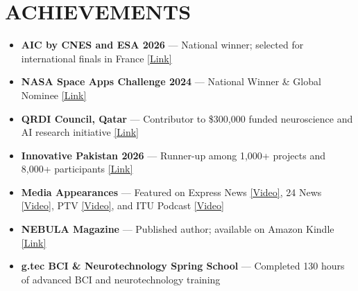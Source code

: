 \documentclass[letterpaper,9pt]{article}
\newcommand{\resumeItem}[1]{
  \item \small{#1}
}
\begin{document}
\section{ACHIEVEMENTS}
\begin{itemize}
\resumeItem{\textbf{AIC by CNES and ESA 2026} — National winner; selected for international finals in France \href{https://www.linkedin.com/posts/information-technology-university_\%F0\%9D\%97\%9C\%F0\%9D\%97\%A7\%F0\%9D\%97\%A8-\%F0\%9D\%97\%A7\%F0\%9D\%97\%B2\%F0\%9D\%97\%AE\%F0\%9D\%97\%BA-\%F0\%9D\%98\%81\%F0\%9D\%97\%BC-\%F0\%9D\%97\%A5\%F0\%9D\%97\%B2\%F0\%9D\%97\%BD\%F0\%9D\%97\%BF\%F0\%9D\%97\%B2\%F0\%9D\%98\%80\%F0\%9D\%97\%B2\%F0\%9D\%97\%BB\%F0\%9D\%98\%81-\%F0\%9D\%97\%A3\%F0\%9D\%97\%AE\%F0\%9D\%97\%B8\%F0\%9D\%97\%B6\%F0\%9D\%98\%80\%F0\%9D\%98\%81\%F0\%9D\%97\%AE\%F0\%9D\%97\%BB-activity-7440108338027065344-qhc0}{[Link]}}
\resumeItem{\textbf{NASA Space Apps Challenge 2024} — National Winner \& Global Nominee \href{https://www.spaceappschallenge.org/nasa-space-apps-2024/find-a-team/nebula-galaxar/?tab=details}{[Link]}}
\resumeItem{\textbf{QRDI Council, Qatar} — Contributor to \$300,000 funded neuroscience and AI research initiative \href{https://www.linkedin.com/feed/update/urn:li:activity:7424050684309917696/}{[Link]}}
\resumeItem{\textbf{Innovative Pakistan 2026} — Runner-up among 1,000+ projects and 8,000+ participants \href{https://www.linkedin.com/feed/update/urn:li:activity:7470778147882569728/}{[Link]}}
\resumeItem{\textbf{Media Appearances} — Featured on Express News \href{https://www.instagram.com/reel/DDPYqbKqwj1/}{[Video]}, 24 News \href{https://www.instagram.com/reel/DDM2wrHKapq/}{[Video]}, PTV \href{https://www.instagram.com/reel/DIgQsOLKF_b/}{[Video]}, and ITU Podcast \href{https://www.instagram.com/reel/DHdmzG6KDvw/}{[Video]}}
\resumeItem{\textbf{NEBULA Magazine} — Published author; available on Amazon Kindle \href{https://www.amazon.com/Archives-2-NEBULA-Mehar-Ali-ebook/dp/B0DVLS5161}{[Link]}}
\resumeItem{\textbf{g.tec BCI \& Neurotechnology Spring School} — Completed 130 hours of advanced BCI and neurotechnology training}
\end{itemize}


\end{document}
